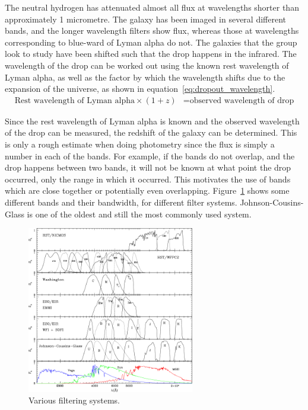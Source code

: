 		The neutral hydrogen has attenuated almost all flux at wavelengths shorter than approximately 1 micrometre. The galaxy has been imaged in several different bands, and the longer wavelength filters show flux, whereas those at wavelengths corresponding to blue-ward of Lyman alpha do not. The galaxies that the group look to study have been shifted such that the drop happens in the infrared. The wavelength of the drop can be worked out using the known rest wavelength of Lyman alpha, as well as the factor by which the wavelength shifts due to the expansion of the universe, as shown in equation~\ref{eq:dropout_wavelength}.
		\begin{align}
			\text{Rest wavelength of Lyman alpha} \times (1+z) &= \text{observed wavelength of drop}\label{eq:dropout_wavelength}
		\end{align}

		Since the rest wavelength of Lyman alpha is known and the observed wavelength of the drop can be measured, the redshift of the galaxy can be determined. This
		is only a rough estimate when doing photometry since the flux is simply a number in each of the bands. For example, if the bands do not overlap, and the drop happens between two bands, it will not be known at what point the drop occurred, only the range in which it occurred. This motivates the use of bands which are close together or potentially even overlapping. Figure~\ref{fig:filter-systems} shows some different bands and their bandwidth, for different filter systems. Johnson-Cousins- Glass is one of the oldest and still the most commonly used system\cite{BasicObservationalKnowledge}.
		\begin{figure}[ht]
			\centering
			\includegraphics[width=0.65\textwidth]{../Images/filter-systems.png}
			\caption{Various filtering systems\cite{refId0}.\label{fig:filter-systems}}
		\end{figure}

